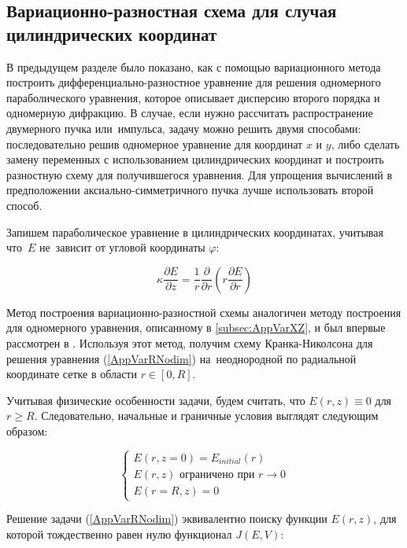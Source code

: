 \subsection{Вариационно-разностная схема для случая цилиндрических координат}
\label{subsec:AppVarRZ}

В предыдущем разделе было показано, как с помощью вариационного метода построить
дифференциально-разностное уравнение для решения одномерного параболического уравнения,
которое описывает дисперсию второго порядка и одномерную дифракцию. В случае, если нужно
рассчитать распространение двумерного пучка или~импульса, задачу можно решить двумя способами: последовательно
решив одномерное уравнение для координат $x$ и $y$, либо сделать замену переменных с использованием
цилиндрических координат и построить разностную схему для получившегося уравнения. Для упрощения вычислений
в предположении аксиально-симметричного пучка лучше использовать второй способ.

Запишем параболическое уравнение в цилиндрических координатах, учитывая что~$E$ не~зависит от угловой координаты $\varphi$:

\begin{equation}\label{AppVarRNodim}
\kappa\dfrac{\partial E}{\partial z} = \dfrac{1}{r}\dfrac{\partial}{\partial r}\left( r \dfrac{\partial E}{\partial r} \right)
\end{equation}

Метод построения вариационно-разностной схемы аналогичен методу построения для одномерного уравнения, описанному в \ref{subsec:AppVarXZ},
и был впервые рассмотрен в \cite{Dyshko1968}. Используя этот метод, получим схему Кранка-Николсона
для решения уравнения (\ref{AppVarRNodim}) на~неоднородной по радиальной координате сетке в области $r \in \left[0, R\right]$.

Учитывая физические особенности задачи, будем считать, что $E(r, z) \equiv 0$ для $r \geq R$. Следовательно,
начальные и граничные условия выглядят следующим образом:

\begin{equation}
\left\{
\begin{array}{l}
	E(r, z = 0) = E_{initial}(r) \\[1em]
	E(r, z) \mbox{ ограничено при } r \rightarrow 0 \\[1em]
	E(r = R, z) = 0
\end{array}
\right.
\end{equation}

Решение задачи (\ref{AppVarRNodim}) эквивалентно поиску функции $E(r, z)$,
для которой тождественно равен нулю функционал $J(E, V)$:

